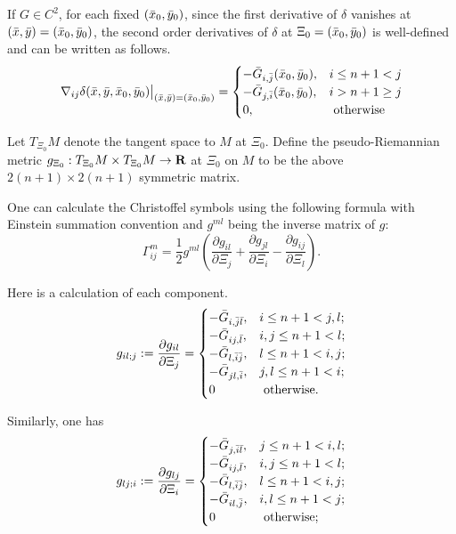 If $G\in C^2$, for each fixed $(\bar{x}_0, \bar{y}_0)$, since the first derivative of $\delta$ vanishes at $(\bar{x}, \bar{y}) = (\bar{x}_0, \bar{y}_0)$,  
the second order derivatives of $\delta$ at $\Xi_0 = (\bar{x}_0, \bar{y}_0)$ is well-defined and can be written as follows.
\begin{equation}\label{pseudo_metric}
	\nabla_{ij} \delta (\bar{x}, \bar{y}, \bar{x}_0, \bar{y}_0){\big|}_{(\bar{x}, \bar{y}) = (\bar{x}_0, \bar{y}_0)}
	=\begin{cases}
	-\bar{G}_{i,\bar{j}}(\bar{x}_0, \bar{y}_0),& i\le n+1 < j\\
	-\bar{G}_{j, \bar{i}}(\bar{x}_0, \bar{y}_0),& i>n+1 \ge j\\
	0,& \text{ otherwise}
	\end{cases}
\end{equation}  

Let $T_{\Xi_0}M$ denote the tangent space to $M$ at ${\Xi_0}$. Define the pseudo-Riemannian metric $ g_{\Xi_0}: T_{\Xi_0}M\times T_{\Xi_0}M \rightarrow {\mathbf R}$ at $\Xi_0$ on $M$ to be the above $2(n+1) \times 2(n+1)$ symmetric matrix.\medskip

One can calculate the Christoffel symbols using the following formula with Einstein summation convention and $g^{ml}$ being the inverse matrix of $g$:
\begin{equation}\label{Gamma}
	\Gamma_{ij}^m = \frac{1}{2} g^{ml}(\frac{\partial g_{il}}{\partial \Xi_j} + \frac{\partial g_{jl}}{\partial \Xi_i} - \frac{\partial g_{ij}}{\partial \Xi_l}).
\end{equation}

Here is a calculation of each component.
\begin{equation}
g_{il;j}:=	\frac{\partial g_{il}}{\partial \Xi_j} = \begin{cases}
-	\bar{G}_{i, \bar{j}\bar{l}}, & i \le n+1 < j, l; \\
-	\bar{G}_{ij, \bar{l}}, & i,j \le n+1 <l; \\
-	\bar{G}_{l, \bar{i}\bar{j}}, & l \le n+1 <i,j; \\
-	\bar{G}_{jl, \bar{i}}, & j,l \le  n+1<i ; \\
	0 & \text{ otherwise}.
	\end{cases}
\end{equation}

Similarly, one has
\begin{equation}
g_{lj;i}:=\frac{\partial g_{lj}}{\partial \Xi_i} = \begin{cases}
-\bar{G}_{j, \bar{i}\bar{l}}, & j \le n+1 < i, l; \\
-\bar{G}_{ij, \bar{l}}, & i,j \le n+1 <l; \\
-\bar{G}_{l, \bar{i}\bar{j}}, & l \le n+1 < i,j; \\
-\bar{G}_{il, \bar{j}}, &  i,l \le n+1 <j ; \\
0 & \text{ otherwise};
\end{cases}
\end{equation}

